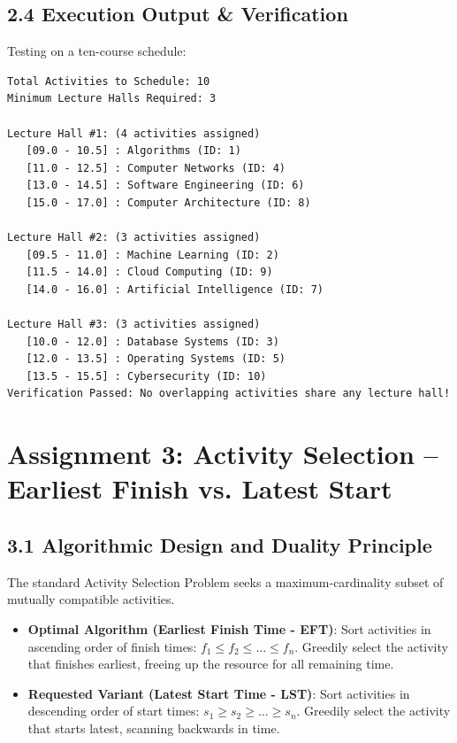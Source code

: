 \documentclass[12pt]{article}
\begin{document}
\subsection*{2.4 Execution Output \& Verification}
Testing on a ten-course schedule:
\begin{lstlisting}
Total Activities to Schedule: 10
Minimum Lecture Halls Required: 3

Lecture Hall #1: (4 activities assigned)
   [09.0 - 10.5] : Algorithms (ID: 1)
   [11.0 - 12.5] : Computer Networks (ID: 4)
   [13.0 - 14.5] : Software Engineering (ID: 6)
   [15.0 - 17.0] : Computer Architecture (ID: 8)

Lecture Hall #2: (3 activities assigned)
   [09.5 - 11.0] : Machine Learning (ID: 2)
   [11.5 - 14.0] : Cloud Computing (ID: 9)
   [14.0 - 16.0] : Artificial Intelligence (ID: 7)

Lecture Hall #3: (3 activities assigned)
   [10.0 - 12.0] : Database Systems (ID: 3)
   [12.0 - 13.5] : Operating Systems (ID: 5)
   [13.5 - 15.5] : Cybersecurity (ID: 10)
Verification Passed: No overlapping activities share any lecture hall!
\end{lstlisting}

\newpage

\section*{Assignment 3: Activity Selection -- Earliest Finish vs. Latest Start}

\subsection*{3.1 Algorithmic Design and Duality Principle}
The standard Activity Selection Problem seeks a maximum-cardinality subset of mutually compatible activities.
\begin{itemize}
    \item \textbf{Optimal Algorithm (Earliest Finish Time - EFT)}: Sort activities in ascending order of finish times: $f_1 \le f_2 \le \dots \le f_n$. Greedily select the activity that finishes earliest, freeing up the resource for all remaining time.
    \item \textbf{Requested Variant (Latest Start Time - LST)}: Sort activities in descending order of start times: $s_1 \ge s_2 \ge \dots \ge s_n$. Greedily select the activity that starts latest, scanning backwards in time.
\end{itemize}
\end{document}
